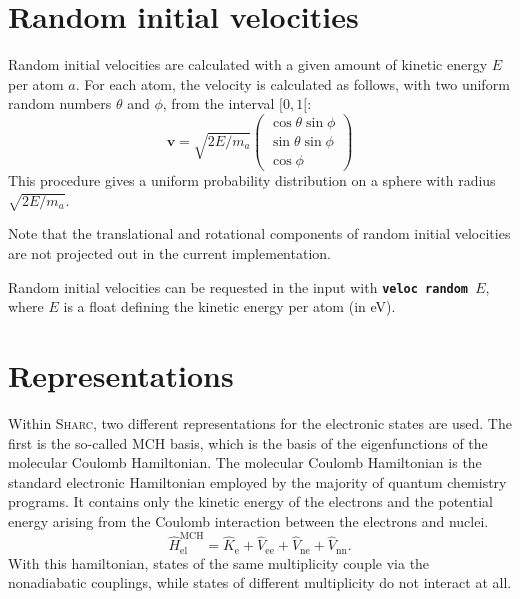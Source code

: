 \documentclass[a4paper,10pt,DIV=15,openany,twoside=false]{scrbook}
\newcommand{\sharc}{\textsc{Sharc}}
\newcommand{\ttt}[1]{\textbf{\texttt{#1}}}
\newcommand{\E}{\ensuremath{\mathrm{e}}}
\newcommand{\VEC}[1]{\ensuremath{\mathbf{#1}}}
\begin{document}

\section{Random initial velocities}\label{met:veloc}

Random initial velocities are calculated with a given amount of kinetic energy $E$ per atom $a$. For each atom, the velocity is calculated as follows, with two uniform random numbers $\theta$ and $\phi$, from the interval $[0,1[$:
\begin{equation}
  \VEC{v}=\sqrt{2E/m_a}
  \begin{pmatrix}
    \cos{\theta}\sin{\phi}\\
    \sin{\theta}\sin{\phi}\\
    \cos{\phi}
  \end{pmatrix}
\end{equation}
This procedure gives a uniform probability distribution on a sphere with radius $\sqrt{2E/m_a}$.

Note that the translational and rotational components of random initial velocities are not projected out in the current implementation.

Random initial velocities can be requested in the input with \ttt{veloc random $E$}, where $E$ is a float defining the kinetic energy per atom (in eV).


\section{Representations}\label{sec:repr}

Within \sharc, two different representations for the electronic states are used. The first is the so-called MCH basis, which is the basis of the eigenfunctions of the molecular Coulomb Hamiltonian. The molecular Coulomb Hamiltonian is the standard electronic Hamiltonian employed by the majority of quantum chemistry programs. It contains only the kinetic energy of the electrons and the potential energy arising from the Coulomb interaction between the electrons and nuclei.
\begin{equation}
  \hat{H}_{\text{el}}^{\text{MCH}}
  =\hat{K}_{\E}
  +\hat{V}_{\text{ee}}
  +\hat{V}_{\text{ne}}
  +\hat{V}_{\text{nn}}.
\end{equation}
With this hamiltonian, states of the same multiplicity couple via the nonadiabatic couplings, while states of different multiplicity do not interact at all. 
\end{document}
